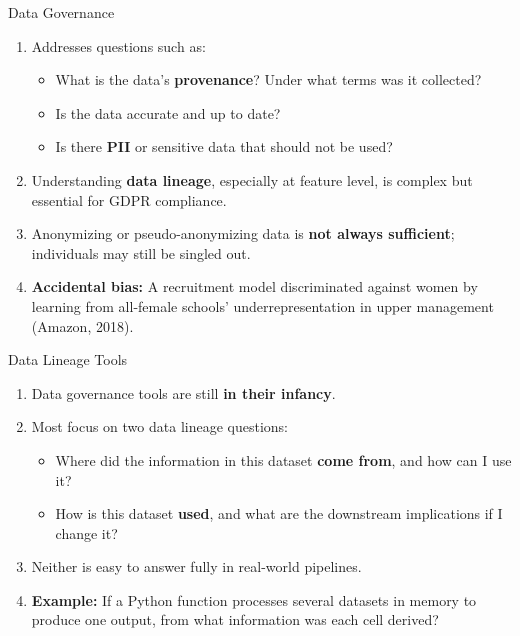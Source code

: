 \begin{frame}{Data Governance}
\begin{enumerate}
\item<1-> Addresses questions such as:
    \begin{itemize}
    \item What is the data's \textbf{provenance}? Under what terms was it collected?
    \item Is the data accurate and up to date?
    \item Is there \textbf{PII} or sensitive data that should not be used?
    \end{itemize}
\item<2-> Understanding \textbf{data lineage}, especially at feature level, is complex but essential for GDPR compliance.
\item<3-> Anonymizing or pseudo-anonymizing data is \textbf{not always sufficient}; individuals may still be singled out.
\item<4-> \textbf{Accidental bias:} A recruitment model discriminated against women by learning from all-female schools' underrepresentation in upper management (Amazon, 2018).
\end{enumerate}
\end{frame}

\begin{frame}{Data Lineage Tools}
\begin{enumerate}
\item<1-> Data governance tools are still \textbf{in their infancy}.
\item<2-> Most focus on two data lineage questions:
    \begin{itemize}
    \item Where did the information in this dataset \textbf{come from}, and how can I use it?
    \item How is this dataset \textbf{used}, and what are the downstream implications if I change it?
    \end{itemize}
\item<3-> Neither is easy to answer fully in real-world pipelines.
\item<4-> \textbf{Example:} If a Python function processes several datasets in memory to produce one output, from what information was each cell derived?
\end{enumerate}
\end{frame}

